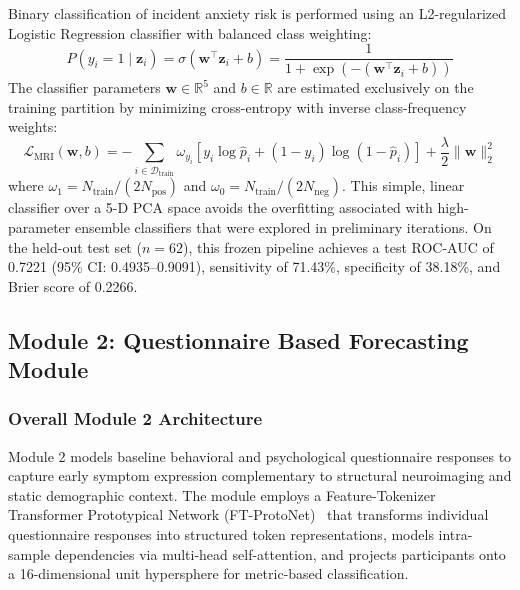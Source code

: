 \documentclass[10pt,letterpaper]{article}
\begin{document}
        Binary classification of incident anxiety risk is performed using an L2-regularized Logistic Regression classifier with balanced class weighting:
        \begin{equation} \label{eq:logreg}
        P(y_i = 1 \mid \mathbf{z}_i) = \sigma(\mathbf{w}^\top \mathbf{z}_i + b) = \frac{1}{1 + \exp(-(\mathbf{w}^\top \mathbf{z}_i + b))}
        \end{equation}
        The classifier parameters $\mathbf{w} \in \mathbb{R}^5$ and $b \in \mathbb{R}$ are estimated exclusively on the training partition by minimizing cross-entropy with inverse class-frequency weights:
        \begin{equation} \label{eq:mri_loss}
        \mathcal{L}_{\text{MRI}}(\mathbf{w}, b) = -\sum_{i \in \mathcal{D}_{\text{train}}} \omega_{y_i} \left[ y_i \log \hat{p}_i + (1 - y_i) \log(1 - \hat{p}_i) \right] + \frac{\lambda}{2} \|\mathbf{w}\|_2^2
        \end{equation}
        where $\omega_1 = N_{\text{train}} / (2 N_{\text{pos}})$ and $\omega_0 = N_{\text{train}} / (2 N_{\text{neg}})$. This simple, linear classifier over a 5-D PCA space avoids the overfitting associated with high-parameter ensemble classifiers that were explored in preliminary iterations. On the held-out test set ($n=62$), this frozen pipeline achieves a test ROC-AUC of 0.7221 (95\% CI: 0.4935--0.9091), sensitivity of 71.43\%, specificity of 38.18\%, and Brier score of 0.2266.

        \subsection*{Module 2: Questionnaire Based Forecasting Module}

        \subsubsection*{\textbf{Overall Module 2 Architecture}}
        Module 2 models baseline behavioral and psychological questionnaire responses to capture early symptom expression complementary to structural neuroimaging and static demographic context. The module employs a Feature-Tokenizer Transformer Prototypical Network (FT-ProtoNet)~\cite{ref_fttransformer, ref_snell} that transforms individual questionnaire responses into structured token representations, models intra-sample dependencies via multi-head self-attention, and projects participants onto a 16-dimensional unit hypersphere for metric-based classification.
\end{document}
